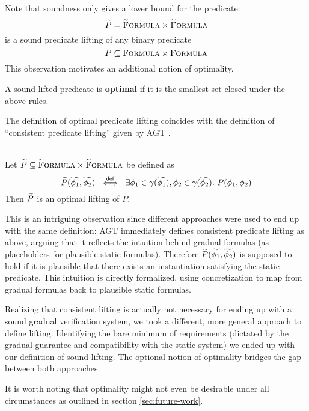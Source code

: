 Note that soundness only gives a lower bound for the predicate:
$$\widetilde{P} = \textup{\textsc{\ensuremath{\widetilde{\text{F}}}ormula}} \times \textup{\textsc{\ensuremath{\widetilde{\text{F}}}ormula}}$$ is a sound predicate lifting of any binary predicate $$P \subseteq \textup{\textsc{Formula}} \times \textup{\textsc{Formula}}$$
This observation motivates an additional notion of optimality.

\begin{definition}
    A sound lifted predicate is \textbf{optimal} if it is the smallest set closed under the above rules.
\end{definition}

The definition of optimal predicate lifting coincides with the definition of “consistent predicate lifting” given by AGT \cite{garcia2016abstracting}.
\begin{lemma}
    \label{lemma:consistent-pred-lifting-direct}~\\
    Let $\widetilde{P} \subseteq \textup{\textsc{\ensuremath{\widetilde{\text{F}}}ormula}} \times \textup{\textsc{\ensuremath{\widetilde{\text{F}}}ormula}}$ be defined as
    \begin{displaymath} 
    \widetilde{P}(\widetilde{\phi_1}, \widetilde{\phi_2}) ~\overset{\textup{\textmd{\textsf{def}}}}{\iff}~ \exists \phi_1 \in \gamma(\widetilde{\phi_1}), \phi_2 \in \gamma(\widetilde{\phi_2}).~ P(\phi_1, \phi_2)
    \end{displaymath}
    Then $\widetilde{P}$ is an optimal lifting of $P$.
\end{lemma} %
This is an intriguing observation since different approaches were used to end up with the same definition:
AGT immediately defines consistent predicate lifting as above, arguing that it reflects the intuition behind gradual formulas (as placeholders for plausible static formulas).
Therefore $\widetilde{P}(\widetilde{\phi_1}, \widetilde{\phi_2})$ is supposed to hold if it is plausible that there exists an instantiation satisfying the static predicate.
This intuition is directly formalized, using concretization to map from gradual formulas back to plausible static formulas.

\begin{comment}
We noticed early that this definition is too strong for gradual verification rules in general, due to the complexity of verification rules compared to typing rules:
A judgment $\thoare{}{\phi_1}{s}{\phi_2}$ (note that $s$ may be a sequence, contain method calls, etc.) 

In chapter \ref{sec:abstracting-static-semantics} we will see examples of gradual predicates which are not optimal and would thus not fit into AGT's model of consistent lifting.
\end{comment}

Realizing that consistent lifting is actually not necessary for ending up with a sound gradual verification system, we took a different, more general approach to define lifting.
Identifying the bare minimum of requirements (dictated by the gradual guarantee and compatibility with the static system) we ended up with our definition of sound lifting.
The optional notion of optimality bridges the gap between both approaches.

It is worth noting that optimality might not even be desirable under all circumstances as outlined in section \ref{sec:future-work}.

